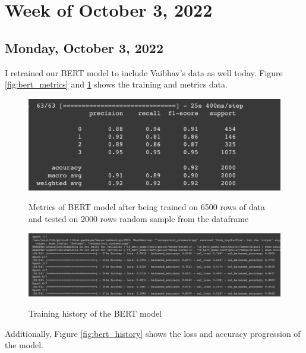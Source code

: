 \documentclass[11pt,letterpaper]{article}
\begin{document}
\section{Week of October 3, 2022}

\subsection{Monday, October 3, 2022}
I retrained our BERT model to include Vaibhav's data as well today. Figure \ref{fig:bert_metrics} and \ref{fig:bert_training} shows the training and metrics data.

\begin{figure}[hbt!]
  \centering
  \begin{minipage}[b]{0.45\textwidth}
    \includegraphics[width=\textwidth]{images/bert_metrics.png}
    \label{fig:bert_metrics}
    \caption{Metrics of BERT model after being trained on 6500 rows of data and tested on 2000 rows random sample from the dataframe}
  \end{minipage}
  \hfill
  \begin{minipage}[b]{0.45\textwidth}
    \includegraphics[width=\textwidth]{images/bert_training.png}
    \label{fig:bert_training}
    \caption{Training history of the BERT model}
  \end{minipage}
\end{figure}

Additionally, Figure \ref{fig:bert_history} shows the loss and accuracy progression of the model.
\end{document}

